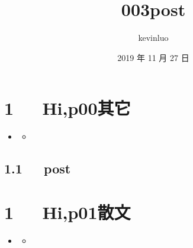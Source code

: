 \documentclass[letterpaper,12pt,english]{sphinxmanual}
\title{003post}
\date{2019 年 11 月 27 日}
\author{kevinluo}
\begin{document}
\pagestyle{empty}
\sphinxmaketitle
\pagestyle{plain}
\sphinxtableofcontents
\pagestyle{normal}
\label{\detokenize{index::doc}}



\chapter{1   Hi,p00其它}
\label{\detokenize{p00_u5176_u5b83/Hello_uff0cp00_u5176_u5b83:hi-p00}}\label{\detokenize{p00_u5176_u5b83/Hello_uff0cp00_u5176_u5b83::doc}}
\begin{sphinxShadowBox}
\begin{itemize}
\item {} 
\label{\detokenize{p00_u5176_u5b83/Hello_uff0cp00_u5176_u5b83:id2}}{\hyperref[\detokenize{p00_u5176_u5b83/Hello_uff0cp00_u5176_u5b83:hi-p00}]{}}
\begin{itemize}
\item {} 
\label{\detokenize{p00_u5176_u5b83/Hello_uff0cp00_u5176_u5b83:id3}}{\hyperref[\detokenize{p00_u5176_u5b83/Hello_uff0cp00_u5176_u5b83:post}]{}}

\end{itemize}

\end{itemize}
\end{sphinxShadowBox}


\section{1.1   post}
\label{\detokenize{p00_u5176_u5b83/Hello_uff0cp00_u5176_u5b83:post}}

\chapter{1   Hi,p01散文}
\label{\detokenize{p01_u6563_u6587/Hello_uff0cp01_u6563_u6587:hi-p01}}\label{\detokenize{p01_u6563_u6587/Hello_uff0cp01_u6563_u6587::doc}}
\begin{sphinxShadowBox}
\begin{itemize}
\item {} 
\label{\detokenize{p01_u6563_u6587/Hello_uff0cp01_u6563_u6587:id2}}{\hyperref[\detokenize{p01_u6563_u6587/Hello_uff0cp01_u6563_u6587:hi-p01}]{}}
\begin{itemize}
\item {} 
\label{\detokenize{p01_u6563_u6587/Hello_uff0cp01_u6563_u6587:id3}}{\hyperref[\detokenize{p01_u6563_u6587/Hello_uff0cp01_u6563_u6587:post}]{}}

\end{itemize}

\end{itemize}
\end{sphinxShadowBox}
\end{document}
